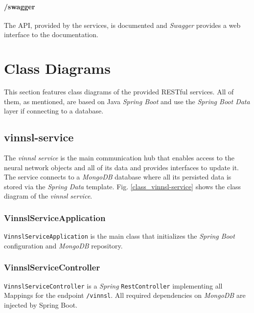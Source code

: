 \paragraph{/swagger}\label{swagger-1}

The API, provided by the services, is documented and \emph{Swagger}
provides a web interface to the documentation.

\subsubsection{}\label{section}

\section{Class Diagrams}\label{class-diagrams}

This section features class diagrams of the provided RESTful services.
All of them, as mentioned, are based on Java \emph{Spring Boot} and use
the \emph{Spring Boot Data} layer if connecting to a database.

\subsection{vinnsl-service}\label{vinnsl-service-1}

The \emph{vinnsl service} is the main communication hub that enables
access to the neural network objects and all of its data and provides
interfaces to update it. The service connects to a \emph{MongoDB}
database where all its persisted data is stored via the \emph{Spring
Data} template. Fig. \ref{class_vinnsl-service} shows the class diagram
of the \emph{vinnsl service}.

\subsubsection{VinnslServiceApplication}\label{vinnslserviceapplication}

\texttt{VinnslServiceApplication} is the main class that initializes the
\emph{Spring Boot} configuration and \emph{MongoDB} repository.

\subsubsection{VinnslServiceController}\label{vinnslservicecontroller}

\texttt{VinnslServiceController} is a \emph{Spring}
\texttt{RestController} implementing all Mappings for the endpoint
\texttt{/vinnsl}. All required dependencies on \emph{MongoDB} are
injected by Spring Boot.

